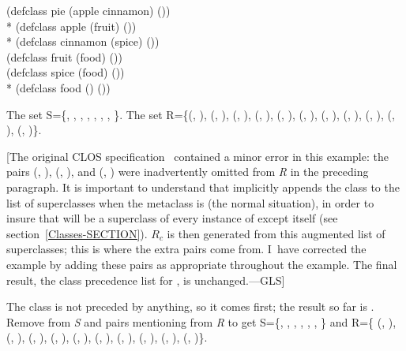 \begin{lisp}
(defclass pie (apple cinnamon) ()) \\*
(defclass apple (fruit) ()) \\*
(defclass cinnamon (spice) ()) \\
(defclass fruit (food) ()) \\
(defclass spice (food) ()) \\*
(defclass food () ())
\end{lisp}

\begin{flushleft}

The set
S=\{,
,
,
,
,
,
,
\}.
The set R=\{(,
),
(,
),
(,
),
(,
),
(,
),
(,
),
(,
),
(,
),
(,
),
(,
),
(,
)\}.

[The original CLOS specification~\cite{SIGPLAN-CLOS,LASC-CLOS-PART-1}
contained a minor error in this example: the pairs
(,
),
(,
), and
(,
)
were inadvertently omitted from \emph{R} in the preceding paragraph.
It is important to understand that  implicitly appends the
class  to the list of superclasses when the metaclass
is  (the normal situation),
in order to insure that  will be a superclass
of every instance of  except  itself
(see section~\ref{Classes-SECTION}).
$R_{c}$ is then generated from this augmented list of superclasses;
this is where the extra pairs come from.  I~have corrected the example
by adding these pairs as appropriate throughout the example.  The final result,
the class precedence list for ,
is unchanged.---GLS]

The class  is not preceded by anything, so it comes first;
the result so far is .  Remove  from \emph{S} and pairs
mentioning  from \emph{R} to get
S=\{,
,
,
,
,
,
\} and R=\{
(,
),
(,
),
(,
),
(,
),
(,
),
(,
),
(,
),
(,
),
(,
),
(,
)\}.


\end{flushleft}
